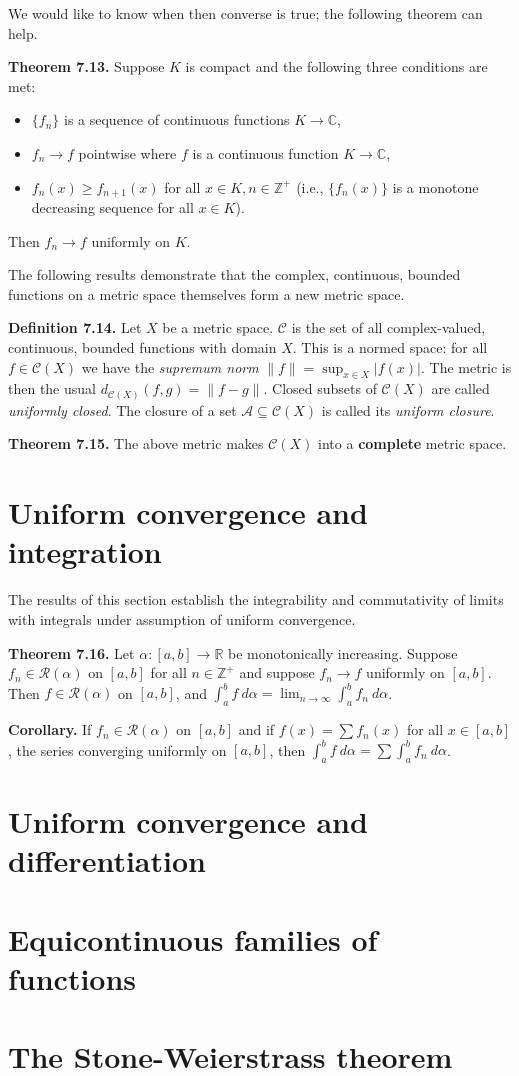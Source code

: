 \documentclass[a4paper]{article}
\newcommand{\C}{\mathbb{C}}
\newcommand{\R}{\mathbb{R}}
\newcommand{\Z}{\mathbb{Z}}
\begin{document}
We would like to know when then converse is true; the following theorem can help.

\textbf{Theorem 7.13.} Suppose $K$ is compact and the following three conditions are met:

\begin{itemize}
    \item $\{f_n\}$ is a sequence of continuous functions $K \to \C$,
    \item $f_n \to f$ pointwise where $f$ is a continuous function $K \to \C$,
    \item $f_n(x) \geq f_{n+1}(x)$ for all $x \in K, n \in \Z^+$ (i.e., $\{f_n(x)\}$ is a monotone decreasing sequence for all $x \in K$).
\end{itemize}

Then $f_n \to f$ uniformly on $K$.

The following results demonstrate that the complex, continuous, bounded functions on a metric space themselves form a new metric space.

\textbf{Definition 7.14.} Let $X$ be a metric space. $\mathscr{C}$ is the set of all complex-valued, continuous, bounded functions with domain $X$. This is a normed space: for all $f \in \mathscr{C}(X)$ we have the \emph{supremum norm} $\displaystyle \|f\| = \sup_{x \in X} |f(x)|$. The metric is then the usual $d_{\mathscr{C}(X)}(f, g) = \|f - g\|$. Closed subsets of $\mathscr{C}(X)$ are called \emph{uniformly closed}. The closure of a set $\mathscr{A} \subseteq \mathscr{C}(X)$ is called its \emph{uniform closure}.

\textbf{Theorem 7.15.} The above metric makes $\mathscr{C}(X)$ into a \textbf{complete} metric space.

\section{Uniform convergence and integration}

The results of this section establish the integrability and commutativity of limits with integrals under assumption of uniform convergence.

\textbf{Theorem 7.16.} Let $\alpha : [a, b] \to \R$ be monotonically increasing. Suppose $f_n \in \mathscr{R}(\alpha)$ on $[a, b]$ for all $n \in \Z^+$ and suppose $f_n \to f$ uniformly on $[a, b]$. Then $f \in \mathscr{R}(\alpha)$ on $[a, b]$, and $\displaystyle \int_a^b f\ d\alpha = \lim_{n \to \infty} \int_a^b f_n\ d\alpha$.

\textbf{Corollary.} If $f_n \in \mathscr{R}(\alpha)$ on $[a, b]$ and if $f(x) = \sum f_n(x)$ for all $x \in [a, b]$, the series converging uniformly on $[a, b]$, then $\displaystyle \int_a^b f\ d\alpha = \sum \int_a^b f_n\ d\alpha$.

\section{Uniform convergence and differentiation}

\section{Equicontinuous families of functions}

\section{The Stone-Weierstrass theorem}
\end{document}
